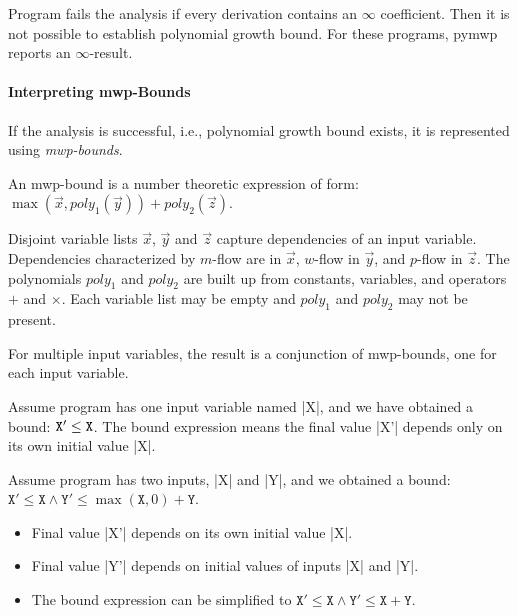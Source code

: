 Program fails the analysis if every derivation contains an \(\infty\) coefficient.
Then it is not possible to establish polynomial growth bound.
For these programs, pymwp reports an \(\infty\)-result.

\paragraph*{Interpreting mwp-Bounds}

If the analysis is successful, i.e., polynomial growth bound exists, it is represented using \emph{mwp-bounds}.

An mwp-bound is a number theoretic expression of form: \(\max(\vec x, poly_1(\vec y)) + poly_2(\vec z)\).

Disjoint variable lists \(\vec x\), \(\vec y\) and \(\vec z\) capture dependencies of an input variable.
Dependencies characterized by \(m\)-flow are in \(\vec x\), \(w\)-flow in \(\vec y\), and \(p\)-flow in \(\vec z\).
The polynomials \(poly_1\) and \(poly_2\) are built up from constants, variables, and operators \(+\) and \(\times\).
Each variable list may be empty and \(poly_1\) and \(poly_2\) may not be present.

For multiple input variables, the result is a conjunction of mwp-bounds, one for each input variable.

\begin{example}
    Assume program has one input variable named \pr|X|, and we have obtained a bound: \(\prm{X}' \leq \prm{X}\).
    The bound expression means the final value \pr|X'| depends only on its own initial value \pr|X|.
\end{example}

\begin{example}
    Assume program has two inputs, \pr|X| and \pr|Y|, and we obtained a bound:
    \(\texttt{X}' \leq \texttt{X} \land \texttt{Y}' \leq \max(\texttt{X}, 0) + \texttt{Y}\).
\end{example}

\begin{itemize}
    \item Final value \pr|X'| depends on its own initial value \pr|X|.
    \item Final value \pr|Y'| depends on initial values of inputs \pr|X| and \pr|Y|.
    \item The bound expression can be simplified to \(\texttt{X}' \leq \texttt{X} \land \texttt{Y}' \leq \texttt{X} + \texttt{Y}\).
\end{itemize}

